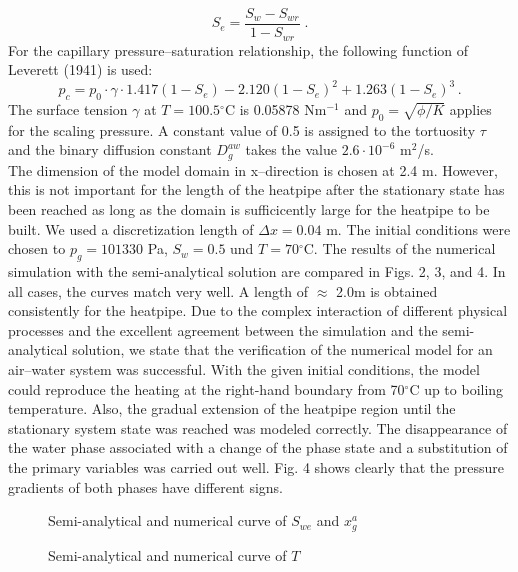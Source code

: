\begin{equation}
S_e = \frac{S_w - S_{wr}}{1-S_{wr}}\; .
\end{equation}
For the capillary pressure--saturation relationship, the following
function of Leverett (1941) \cite{lev1} is used:
\begin{equation}
\label{eqleve}
p_c = p_0 \cdot \gamma \cdot 1.417(1-S_e) - 2.120(1-S_e)^2 + 
1.263(1-S_e)^3 \, .
\end{equation}
The surface tension $\gamma$ at $T = 100.5$$^\circ$C is 0.05878 
Nm$^{-1}$
and $p_0 = \sqrt{\phi/K}$ applies for the scaling pressure. A constant
value of 0.5 is assigned to the tortuosity $\tau$ and the binary 
diffusion constant $D_g^{aw}$ takes the value $2.6 \cdot 10^{-6}$ 
m$^2$/s. \\
The dimension of the model domain in x--direction is chosen at 2.4 m.
However, this is not important for the length of the heatpipe after the
stationary state has been reached as long as the domain is 
sufficicently large
for the heatpipe to be built. We used a discretization length of
$\Delta x = 0.04$ m. The initial conditions were chosen to
$p_g = 101330$ Pa, $S_w = 0.5$ und $T = 70$$^\circ$C.
The results of the numerical simulation with the semi-analytical 
solution are compared in Figs. 2, 3, and 
4. In all cases, the curves match very well. 
A length of $\approx$ 2.0m is obtained consistently for the heatpipe.
Due to the complex interaction
of different physical processes and the excellent agreement between the
simulation and the semi-analytical solution, we state that the 
verification of the numerical model for an air--water system was 
successful.
With the given initial conditions, the model could reproduce
the heating at the right-hand boundary from 70$^\circ$C up to
boiling temperature. Also, the gradual extension of the heatpipe
region until the stationary system state was reached was modeled 
correctly.  The disappearance of the water phase associated with a 
change of the phase state and a substitution of the primary variables 
was carried out well. Fig. 4 shows clearly that the pressure 
gradients of both phases have different signs.

\begin{figure}[h]
    \centerline{}
    \caption{Semi-analytical and numerical curve of $S_{we}$ and $x_g^a$}
\end{figure}

\begin{figure}[h]
    \centerline{}
    \caption{Semi-analytical and numerical curve of $T$}
\end{figure}

